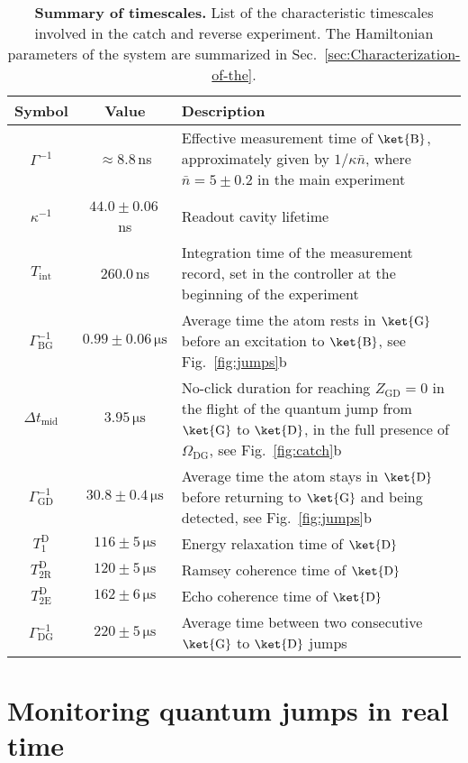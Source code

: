 \begin{table}[!ht]
\begin{centering}
\addtolength{\tabcolsep}{2pt} 
\renewcommand*{\arraystretch}{1.5}
\begin{tabular}{cc>{\raggedright}p{}}
\hline 
\textbf{Symbol}  & \textbf{Value}  & \textbf{Description}\tabularnewline
\hline 
$\Gamma^{-1}$  & $\approx8.8$\,ns  & Effective measurement time of $\ket{\mathrm{B}}$, approximately given
by $1/\kappa\bar{n}$, where $\bar{n}=5\pm0.2$ in the main experiment\tabularnewline
$\kappa^{-1}$  & $44.0\pm0.06$\,ns  & Readout cavity lifetime\tabularnewline
$T_{\mathrm{int}}$  & 260.0\,ns  & Integration time of the measurement record, set in the controller
at the beginning of the experiment \tabularnewline
$\Gamma_{\mathrm{BG}}^{-1}$  & $0.99\pm0.06\,\mathrm{\mu s}$  & Average time the atom rests in $\ket{\mathrm{G}}$ before an excitation
to $\ket{\mathrm{B}}$, see Fig.~\ref{fig:jumps}b\tabularnewline
$\Delta t_{\mathrm{mid}}$  & $3.95\,\mathrm{\mu s}$  & No-click duration for reaching $Z_{\mathrm{GD}}=0$ in the flight
of the quantum jump from $\ket{\mathrm{G}}$ to $\ket{\mathrm{D}}$,
in the full presence of $\Omega_{\mathrm{DG}}$, see Fig.~\ref{fig:catch}b\tabularnewline
$\Gamma_{\mathrm{GD}}^{-1}$  & $30.8\pm0.4\,\mathrm{\mu s}$  & Average time the atom stays in $\ket{\mathrm{D}}$ before returning
to $\ket{\mathrm{G}}$ and being detected, see Fig.~\ref{fig:jumps}b\tabularnewline
$T_{1}^{\mathrm{D}}$  & $116\pm5\,\mathrm{\mu s}$  & Energy relaxation time of $\ket{\mathrm{D}}$\tabularnewline
$T_{2\mathrm{R}}^{\mathrm{D}}$  & $120\pm5\,\mathrm{\mu s}$  & Ramsey coherence time of $\ket{\mathrm{D}}$\tabularnewline
$T_{2\mathrm{E}}^{\mathrm{D}}$  & $162\pm6\,\mathrm{\mu s}$  & Echo coherence time of $\ket{\mathrm{D}}$\tabularnewline
$\Gamma_{\mathrm{DG}}^{-1}$  & $220\pm5\,\mathrm{\mu s}$  & Average time between two consecutive $\ket{\mathrm{G}}$ to $\ket{\mathrm{D}}$
jumps\tabularnewline
\end{tabular}
\par\end{centering}
\caption[Summary of timescales]{\textbf{Summary of timescales. }List of the characteristic timescales
involved in the catch and reverse experiment. The Hamiltonian parameters
of the system are summarized in Sec.~\ref{sec:Characterization-of-the}.
\textbf{\label{tab:Summary-of-timescales.}}}
\end{table}


\section{Monitoring quantum jumps in real time }


